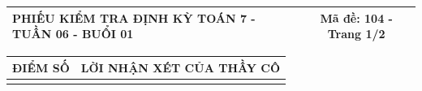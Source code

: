 \documentclass[12pt,a4paper]{article}
\begin{document}
\newpage

\noindent
\begin{tabularx}{\linewidth}{|X|c|}
\hline
\textbf{PHIẾU KIỂM TRA ĐỊNH KỲ TOÁN 7 - TUẦN 06 - BUỔI 01} & \textbf{Mã đề: 104 - Trang 1/2} \\
\hline
\end{tabularx}

\vspace{1.0mm}

\noindent
\begin{tabularx}{\linewidth}{|p{3.2cm}|X|}
\hline
\centering\textbf{ĐIỂM SỐ} & \centering\textbf{LỜI NHẬN XÉT CỦA THẦY CÔ} \tabularnewline
\hline
\rule{0pt}{1.8cm} & \tabularnewline
\hline
\end{tabularx}
\end{document}
